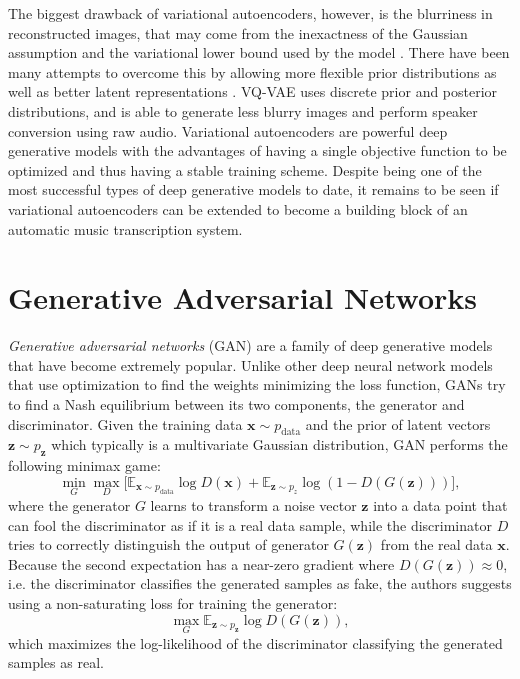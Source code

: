 The biggest drawback of variational autoencoders, however, is the blurriness in reconstructed images, that may come from the inexactness of the Gaussian assumption and the variational lower bound used by the model \cite{doersch2016tutorial}.
There have been many attempts to overcome this by allowing more flexible prior distributions \cite{rezende2015flow} as well as better latent representations \cite{kingma2016iaf}.
VQ-VAE \cite{oord2017vqvae} uses discrete prior and posterior distributions, and is able to generate less blurry images and perform speaker conversion using raw audio.
Variational autoencoders are powerful deep generative models with the advantages of having a single objective function to be optimized and thus having a stable training scheme.
Despite being one of the most successful types of deep generative models to date, it remains to be seen if variational autoencoders can be extended to become a building block of an automatic music transcription system.


\section{Generative Adversarial Networks}\label{sec:gan}

\emph{Generative adversarial networks} (GAN) \cite{goodfellow2014gan} are a family of deep generative models that have become extremely popular.
Unlike other deep neural network models that use optimization to find the weights minimizing the loss function, GANs try to find a Nash equilibrium between its two components, the generator and discriminator.
Given the training data $\bm{x}\sim p_{\mathrm{data}}$ and the prior of latent vectors $\bm{z} \sim p_{\bm{z}}$ which typically is a multivariate Gaussian distribution, GAN performs the following minimax game:
\begin{equation}\label{eqn:gan}
	\min_{G} \max_{D} \Big[ \mathbb{E}_{\bm{x} \sim p_{\mathrm{data}}} {\log D(\bm{x})} + \mathbb{E}_{\bm{z} \sim p_z} \log \left ( 1 - D(G(\bm{z})) \right ) \Big],
\end{equation}
where the generator $G$ learns to transform a noise vector $\bm{z}$ into a data point that can fool the discriminator as if it is a real data sample, while the discriminator $D$ tries to correctly distinguish the output of generator $G(\bm{z})$ from the real data $\bm{x}$.
Because the second expectation has a near-zero gradient where $D(G(\bm{z})) \approx 0$, i.e. the discriminator classifies the generated samples as fake, the authors suggests using a non-saturating loss for training the generator:
\begin{equation}\label{eqn:nsgan}
\max_{G} \mathbb{E}_{\bm{z} \sim p_{\bm{z}}} \log D(G(\bm{z})),
\end{equation}
which maximizes the log-likelihood of the discriminator classifying the generated samples as real.


